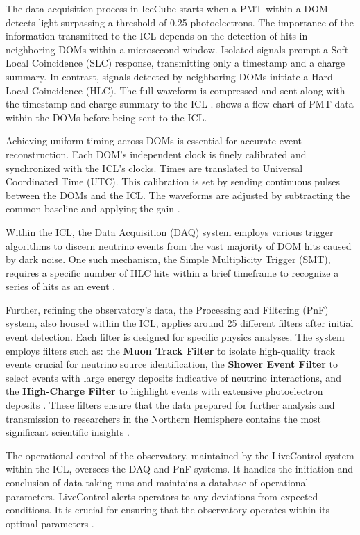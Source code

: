 The data acquisition process in IceCube starts when a PMT within a DOM detects light surpassing a threshold of 0.25 photoelectrons.
The importance of the information transmitted to the ICL depends on the detection of hits in neighboring DOMs within a microsecond window.
Isolated signals prompt a Soft Local Coincidence (SLC) response, transmitting only a timestamp and a charge summary.
In contrast, signals detected by neighboring DOMs initiate a Hard Local Coincidence (HLC).
The full waveform is compressed and sent along with the timestamp and charge summary to the ICL \cite{IC3_thedetector}.
 shows a flow chart of PMT data within the DOMs before being sent to the ICL.

Achieving uniform timing across DOMs is essential for accurate event reconstruction.
Each DOM's independent clock is finely calibrated and synchronized with the ICL's clocks.
Times are translated to Universal Coordinated Time (UTC).
This calibration is set by sending continuous pulses between the DOMs and the ICL.
The waveforms are adjusted by subtracting the common baseline and applying the gain \cite{IC3_thedetector}.

Within the ICL, the Data Acquisition (DAQ) system employs various trigger algorithms to discern neutrino events from the vast majority of DOM hits caused by dark noise.
One such mechanism, the Simple Multiplicity Trigger (SMT), requires a specific number of HLC hits within a brief timeframe to recognize a series of hits as an event \cite{IC3_thedetector}.

Further, refining the observatory's data, the Processing and Filtering (PnF) system, also housed within the ICL, applies around 25 different filters after initial event detection.
Each filter is designed for specific physics analyses.
The system employs filters such as: the \textbf{Muon Track Filter} to isolate high-quality track events crucial for neutrino source identification,
the \textbf{Shower Event Filter} to select events with large energy deposits indicative of neutrino interactions,
and the \textbf{High-Charge Filter} to highlight events with extensive photoelectron deposits \cite{IC3_thedetector}.
These filters ensure that the data prepared for further analysis and transmission to researchers in the Northern Hemisphere contains the most significant scientific insights \cite{IC3_thedetector}.

The operational control of the observatory, maintained by the LiveControl system within the ICL, oversees the DAQ and PnF systems.
It handles the initiation and conclusion of data-taking runs and maintains a database of operational parameters.
LiveControl alerts operators to any deviations from expected conditions.
It is crucial for ensuring that the observatory operates within its optimal parameters \cite{IC3_thedetector}.

